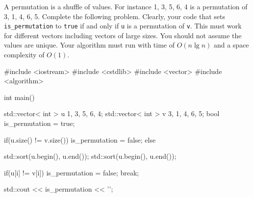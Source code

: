 \nextq
A permutation is a shuffle of values.
For instance 1, 3, 5, 6, 4 is a permutation of 3, 1, 4, 6, 5.
Complete the following problem.
Clearly, your code that sets \verb!is_permutation! to \verb!true!
if and only if \verb!u! is a permutation of \verb!v!.
This must work for different vectors including vectors
of large sizes.
You should not assume the values are unique.
Your algorithm must run with time of $O(n \lg n)$ and a space complexity
of $O(1)$.
\\
\ANSWER
\begin{answercode}
#include <iostream>
#include <cstdlib>
#include <vector>
#include <algorithm>

int main()
{
    std::vector< int > u {1, 3, 5, 6, 4};
    std::vector< int > v {3, 1, 4, 6, 5};
    bool is_permutation = true;

    if(u.size() != v.size())
    {
      is_permutation = false;
    }
    else
    {
      std::sort(u.begin(), u.end());
      std::sort(u.begin(), u.end());

      if(u[i] != v[i])
      {
        is_permutation = false;
        break;
      }
    }

    std::cout << is_permutation << '\n';
}
\end{answercode}


